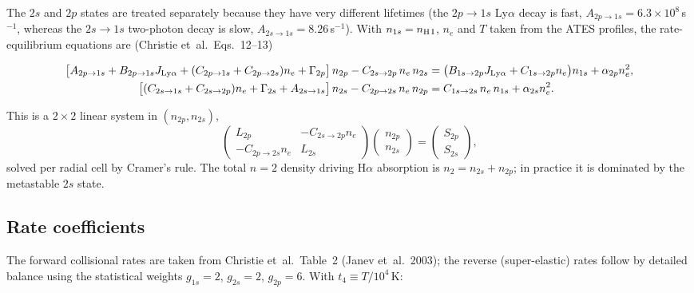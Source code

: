 \documentclass[english,a4paper]{kiseon_memo}
\begin{document}
The $2s$ and $2p$ states are treated separately because they have very
different lifetimes (the $2p\to1s$ Ly$\alpha$ decay is fast,
$A_{2p\to1s}=6.3\times10^{8}\,$s$^{-1}$, whereas the $2s\to1s$ two-photon
decay is slow, $A_{2s\to1s}=8.26\,$s$^{-1}$). With $n_{1s}=n_{\rm H\,I}$,
$n_e$ and $T$ taken from the ATES profiles, the rate-equilibrium
equations are (Christie et~al.\ Eqs.~12--13)

\begin{align}
\bigl[A_{2p\to1s} + B_{2p\to1s}J_{\rm Ly\alpha}
   + (C_{2p\to1s}+C_{2p\to2s})n_e + \Gamma_{2p}\bigr]\,n_{2p}
   - C_{2s\to2p}\,n_e\,n_{2s}
   &= \bigl(B_{1s\to2p}J_{\rm Ly\alpha}+C_{1s\to2p}n_e\bigr)n_{1s}
      + \alpha_{2p}n_e^2, \\
\bigl[(C_{2s\to1s}+C_{2s\to2p})n_e + \Gamma_{2s} + A_{2s\to1s}\bigr]\,n_{2s}
   - C_{2p\to2s}\,n_e\,n_{2p}
   &= C_{1s\to2s}\,n_e\,n_{1s} + \alpha_{2s}n_e^2 .
\end{align}

This is a $2\times2$ linear system in $(n_{2p},n_{2s})$,
\[
\begin{pmatrix} L_{2p} & -C_{2s\to2p}n_e \\ -C_{2p\to2s}n_e & L_{2s}\end{pmatrix}
\begin{pmatrix} n_{2p}\\ n_{2s}\end{pmatrix}
=\begin{pmatrix} S_{2p}\\ S_{2s}\end{pmatrix},
\]
solved per radial cell by Cramer's rule. The total $n=2$ density driving
H$\alpha$ absorption is $n_2 = n_{2s}+n_{2p}$; in practice it is
dominated by the metastable $2s$ state.

\subsection{Rate coefficients}

The forward collisional rates are taken from Christie et~al.\ Table~2
(Janev et~al.~2003); the reverse (super-elastic) rates follow by detailed
balance using the statistical weights $g_{1s}=2$, $g_{2s}=2$, $g_{2p}=6$.
With $t_4 \equiv T/10^4\,$K:
\end{document}
